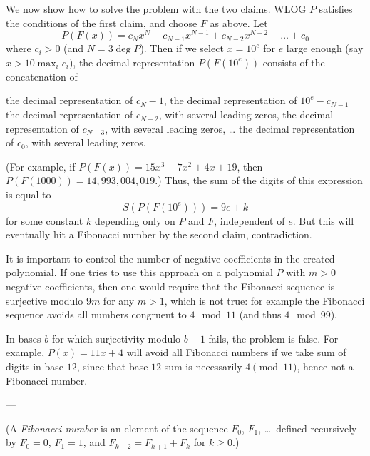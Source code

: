 We now show how to solve the problem with the two claims.
WLOG $P$ satisfies the conditions of the first claim,
and choose $F$ as above.
Let
\[ P(F(x)) = c_N x^N - c_{N-1} x^{N-1} + c_{N-2} x^{N-2} + \dots + c_0 \]
where $c_i > 0$ (and $N = 3 \deg P$).
Then if we select $x = 10^e$ for $e$ large enough
(say $x > 10\max_i c_i$),
the decimal representation $P(F(10^e))$ consists of the concatenation of
\begin{itemize}
  \ii the decimal representation of $c_N-1$,
  \ii the decimal representation of $10^e-c_{N-1}$
  \ii the decimal representation of $c_{N-2}$,
  with several leading zeros,
  \ii the decimal representation of $c_{N-3}$,
  with several leading zeros,
  \ii \dots
  \ii the decimal representation of $c_0$, with several leading zeros.
\end{itemize}
(For example,
if $P(F(x)) = 15x^3 - 7x^2 + 4x + 19$,
then $P(F(1000)) = 14{,}993{,}004{,}019$.)
Thus, the sum of the digits of this expression
is equal to
\[ S(P(F(10^e))) = 9e + k \]
for some constant $k$ depending only on $P$ and $F$,
independent of $e$.
But this will eventually hit a Fibonacci number by the second claim,
contradiction.

\begin{remark*}
  It is important to control the number of negative coefficients
  in the created polynomial.
  If one tries to use this approach on a polynomial $P$
  with $m > 0$ negative coefficients,
  then one would require that the Fibonacci sequence
  is surjective modulo $9m$ for any $m > 1$,
  which is not true:
  for example the Fibonacci sequence avoids all numbers
  congruent to $4 \mod{11}$ (and thus $4 \mod{99}$).

  In bases $b$ for which surjectivity modulo $b-1$ fails,
  the problem is false.
  For example, $P(x) = 11x+4$ will avoid all Fibonacci
  numbers if we take sum of digits in base $12$,
  since that base-$12$ sum is necessarily $4 \pmod{11}$,
  hence not a Fibonacci number.
\end{remark*}


---


(A \emph{Fibonacci number} is an element of the sequence
$F_0$, $F_1$, \dots\ defined recursively by
$F_0 = 0$, $F_1 = 1$, and $F_{k+2} = F_{k+1} + F_k$ for $k \ge 0$.)
